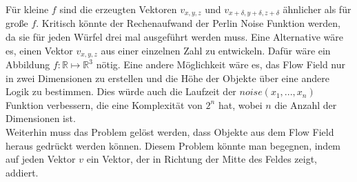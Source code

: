 \documentclass[11pt,a4paper]{article}
\begin{document}
\noindent
Für kleine $f$ sind die erzeugten Vektoren $v_{x, y, z}$ und $v_{x+\delta, y+\delta, z+\delta}$ ähnlicher als für große $f$. Kritisch könnte der Rechenaufwand der Perlin Noise Funktion werden, da sie für jeden Würfel drei mal ausgeführt werden muss. Eine Alternative wäre es, einen Vektor $v_{x, y, z}$ aus einer einzelnen Zahl zu entwickeln. Dafür wäre ein Abbildung $f: \mathbb{R} \mapsto \mathbb{R}^3$ nötig. Eine andere Möglichkeit wäre es, das Flow Field nur in zwei Dimensionen zu erstellen und die Höhe der Objekte über eine andere Logik zu bestimmen. Dies würde auch die Laufzeit der $noise(x_1, ..., x_n)$ Funktion verbessern, die eine Komplexität von $2^n$ hat, wobei $n$ die Anzahl der Dimensionen ist.\\
Weiterhin muss das Problem gelöst werden, dass Objekte aus dem Flow Field heraus gedrückt werden können. Diesem Problem könnte man begegnen, indem auf jeden Vektor $v$ ein Vektor, der in Richtung der Mitte des Feldes zeigt, addiert.
\end{document}
